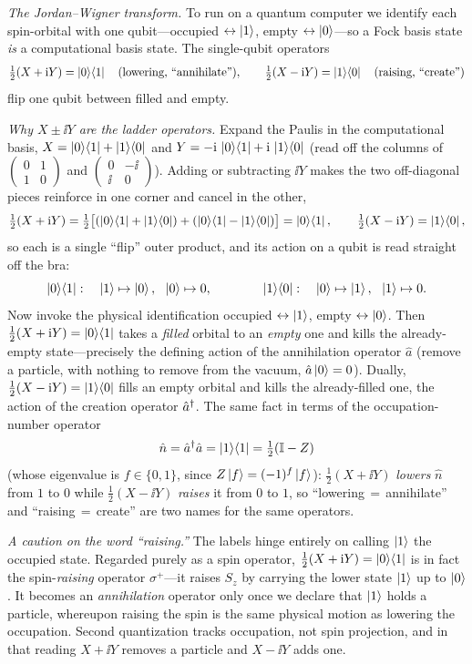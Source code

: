 \begin{example}
\emph{The Jordan--Wigner transform.} To run on a quantum computer we identify each
spin-orbital with one qubit---occupied $\leftrightarrow\ket1$, empty
$\leftrightarrow\ket0$---so a Fock basis state \emph{is} a computational basis state.
The single-qubit operators
\[
  \tfrac12(X+\mathrm{i} Y)=\ket0\!\bra1 \quad(\text{lowering, ``annihilate''}),\qquad
  \tfrac12(X-\mathrm{i} Y)=\ket1\!\bra0 \quad(\text{raising, ``create''})
\]
flip one qubit between filled and empty.

\emph{Why $X\pm\ii Y$ are the ladder operators.} Expand the Paulis in the
computational basis, $X=\ket0\!\bra1+\ket1\!\bra0$ and
$Y=-\mathrm{i}\,\ket0\!\bra1+\mathrm{i}\,\ket1\!\bra0$ (read off the columns of
$\left(\begin{smallmatrix}0&1\\1&0\end{smallmatrix}\right)$ and
$\left(\begin{smallmatrix}0&-\ii\\\ii&0\end{smallmatrix}\right)$). Adding or
subtracting $\ii Y$ makes the two off-diagonal pieces reinforce in one corner and
cancel in the other,
\[
  \tfrac12(X+\mathrm{i} Y)=\tfrac12\bigl[(\ket0\!\bra1+\ket1\!\bra0)
      +(\ket0\!\bra1-\ket1\!\bra0)\bigr]=\ket0\!\bra1,
  \qquad
  \tfrac12(X-\mathrm{i} Y)=\ket1\!\bra0 ,
\]
so each is a single ``flip'' outer product, and its action on a qubit is read straight
off the bra:
\[
  \ket0\!\bra1:\quad \ket1\mapsto\ket0,\ \ \ket0\mapsto0 ,
  \qquad\qquad
  \ket1\!\bra0:\quad \ket0\mapsto\ket1,\ \ \ket1\mapsto0 .
\]
Now invoke the physical identification occupied $\leftrightarrow\ket1$, empty
$\leftrightarrow\ket0$. Then $\tfrac12(X+\mathrm{i} Y)=\ket0\!\bra1$ takes a \emph{filled}
orbital to an \emph{empty} one and kills the already-empty state---precisely the
defining action of the annihilation operator $\hat a$ (remove a particle, with nothing
to remove from the vacuum, $\hat a\ket0=0$). Dually, $\tfrac12(X-\mathrm{i} Y)=\ket1\!\bra0$
fills an empty orbital and kills the already-filled one, the action of the creation
operator $\hat a^{\dagger}$. The same fact in terms of the occupation-number operator
\[
  \hat n=\hat a^{\dagger}\hat a=\ket1\!\bra1=\tfrac12(\mathbb{I}-Z)
\]
(whose eigenvalue is $f\in\{0,1\}$, since $Z\ket f=(-1)^{f}\ket f$): $\tfrac12(X+\ii Y)$
\emph{lowers} $\hat n$ from $1$ to $0$ while $\tfrac12(X-\ii Y)$ \emph{raises} it from
$0$ to $1$, so ``lowering\,$=$\,annihilate'' and ``raising\,$=$\,create'' are two names
for the same operators.

\emph{A caution on the word ``raising.''} The labels hinge entirely on calling $\ket1$
the occupied state. Regarded purely as a spin operator, $\tfrac12(X+\mathrm{i} Y)=\ket0\!\bra1$
is in fact the spin-\emph{raising} operator $\sigma^{+}$---it raises $S_z$ by carrying
the lower state $\ket1$ up to $\ket0$. It becomes an \emph{annihilation} operator only
once we declare that $\ket1$ holds a particle, whereupon raising the spin is the same
physical motion as lowering the occupation. Second quantization tracks occupation, not
spin projection, and in that reading $X+\ii Y$ removes a particle and $X-\ii Y$ adds one.


\end{example}
